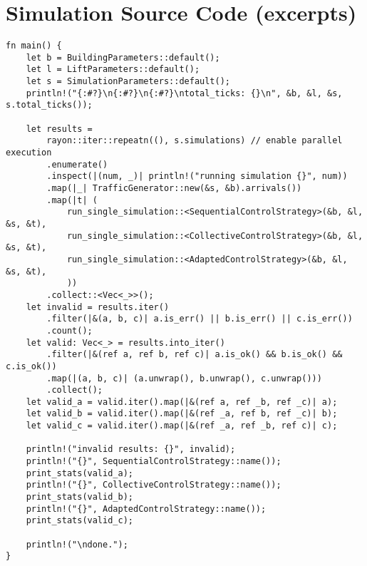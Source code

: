 
\chapter{Simulation Source Code (excerpts)}
\label{app:sim}

\begin{lstlisting}[caption={Main function of the simulation program}, label={lst:app:simmain}]
fn main() {
    let b = BuildingParameters::default();
    let l = LiftParameters::default();
    let s = SimulationParameters::default();
    println!("{:#?}\n{:#?}\n{:#?}\ntotal_ticks: {}\n", &b, &l, &s, s.total_ticks());

    let results =
        rayon::iter::repeatn((), s.simulations) // enable parallel execution
        .enumerate()
        .inspect(|(num, _)| println!("running simulation {}", num))
        .map(|_| TrafficGenerator::new(&s, &b).arrivals())
        .map(|t| (
            run_single_simulation::<SequentialControlStrategy>(&b, &l, &s, &t),
            run_single_simulation::<CollectiveControlStrategy>(&b, &l, &s, &t),
            run_single_simulation::<AdaptedControlStrategy>(&b, &l, &s, &t),
            ))
        .collect::<Vec<_>>();
    let invalid = results.iter()
        .filter(|&(a, b, c)| a.is_err() || b.is_err() || c.is_err())
        .count();
    let valid: Vec<_> = results.into_iter()
        .filter(|&(ref a, ref b, ref c)| a.is_ok() && b.is_ok() && c.is_ok())
        .map(|(a, b, c)| (a.unwrap(), b.unwrap(), c.unwrap()))
        .collect();
    let valid_a = valid.iter().map(|&(ref a, ref _b, ref _c)| a);
    let valid_b = valid.iter().map(|&(ref _a, ref b, ref _c)| b);
    let valid_c = valid.iter().map(|&(ref _a, ref _b, ref c)| c);

    println!("invalid results: {}", invalid);
    println!("{}", SequentialControlStrategy::name());
    print_stats(valid_a);
    println!("{}", CollectiveControlStrategy::name());
    print_stats(valid_b);
    println!("{}", AdaptedControlStrategy::name());
    print_stats(valid_c);

    println!("\ndone.");
}
\end{lstlisting}


